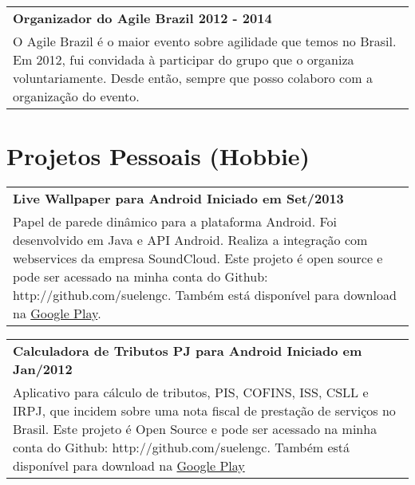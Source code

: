 \documentclass[a4paper, oneside, final]{scrartcl}
\newcommand{\vspc}{\vspace{0.15cm}} %
\begin{document}
\begin{center}
\begin{tabularx}{1\linewidth}{X}
{\bf Organizador do Agile Brazil \hfill 2012 - 2014} \\
O Agile Brazil é o maior evento sobre agilidade que temos no Brasil. Em 2012, fui convidada à participar do grupo que o organiza voluntariamente. Desde então, sempre que posso colaboro com a organização do evento. \vspc\\
\end{tabularx}

\section{Projetos Pessoais (Hobbie)}
\begin{tabularx}{1\linewidth}{X}
{\bf Live Wallpaper para Android \hfill Iniciado em Set/2013} \\
Papel de parede dinâmico para a plataforma Android. Foi desenvolvido em Java e API Android. Realiza a integração com webservices da empresa SoundCloud. Este projeto é open source e pode ser acessado na minha conta do Github: http://github.com/suelengc. Também está disponível para download na {\href{https://play.google.com/store/apps/details?id=br.com.suelengc.wallpaper}{Google Play}}. \vspc\\
\end{tabularx}

\begin{tabularx}{1\linewidth}{X}
{\bf Calculadora de Tributos PJ para Android \hfill Iniciado em Jan/2012} \\
Aplicativo para cálculo de tributos, PIS, COFINS, ISS, CSLL e IRPJ, que incidem sobre uma nota fiscal de prestação de serviços no Brasil. Este projeto é Open Source e pode ser acessado na minha conta do Github: http://github.com/suelengc. Também está disponível para download na {\href{https://play.google.com/store/apps/details?id=br.com.suelengc.calctributospj}{Google Play}} \vspc\\
\end{tabularx}


\end{center}
\end{document}
